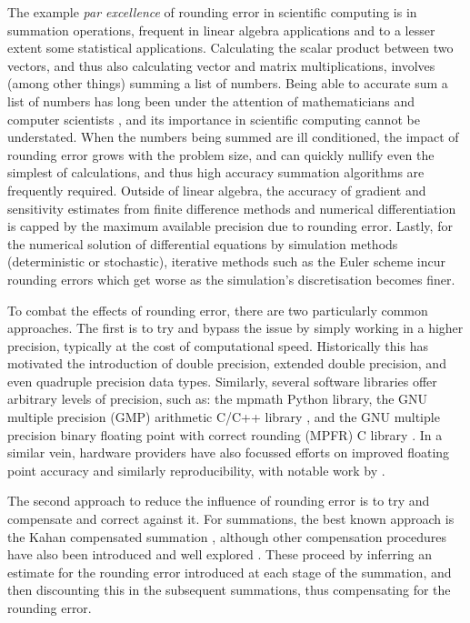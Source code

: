 \documentclass[manuscript,review]{acmart}
\begin{document}
The example \textit{par excellence} of rounding error in scientific computing is in summation operations, frequent in linear algebra applications and to a lesser extent some statistical applications. Calculating the scalar product between two vectors, and thus also calculating vector and matrix multiplications, involves (among other things) summing a list of numbers. Being able to accurate sum a list of numbers has long been under the attention of mathematicians and computer scientists \citep{knuth2014art,kahan1965further,higham1993accuracy,trefethen1997numerical}, and its importance in scientific computing cannot be understated. When the numbers being summed are ill conditioned, the impact of rounding error grows with the problem size, and can quickly nullify even the simplest of calculations, and thus high accuracy summation algorithms are frequently required. Outside of linear algebra, the accuracy of gradient and sensitivity estimates from finite difference methods and numerical differentiation is capped by the maximum available precision due to rounding error. Lastly, for the numerical solution of differential equations by simulation methods (deterministic or stochastic), iterative methods such as the Euler scheme incur rounding errors which get worse as the simulation's discretisation becomes finer. 

To combat the effects of rounding error, there are two particularly common approaches. The first is to try and bypass the issue by simply working in a higher precision, typically at the cost of computational speed. Historically this has motivated the introduction of double precision, extended double precision, and even quadruple precision data types. Similarly, several software libraries offer arbitrary levels of precision, such as: the mpmath \citep{mpmath} Python library, the GNU
multiple precision (GMP) arithmetic C/C++ library \citep{granlund2012gmp}, and the GNU multiple precision binary floating point with correct rounding (MPFR) C library \citep{fousse2007MPFR}. In a similar vein, hardware providers have also focussed efforts on improved floating point accuracy and similarly reproducibility, with notable work by \citet{burgess2018high}.

The second approach to reduce the influence of rounding error is to try and compensate and correct against it. For summations, the best known approach is the Kahan compensated summation \citep{kahan1965further}, although other compensation procedures have also been introduced and well explored \citep{moller1965quasi,knuth2014art,dekker1971floating,neumaier1974rounding,babuska1968numerical,klein2006generalised,linz1970floating,ogita2005accurate}. These proceed by inferring an estimate for the rounding error introduced at each stage of the summation, and then discounting this in the subsequent summations, thus compensating for the rounding error. 
\end{document}
